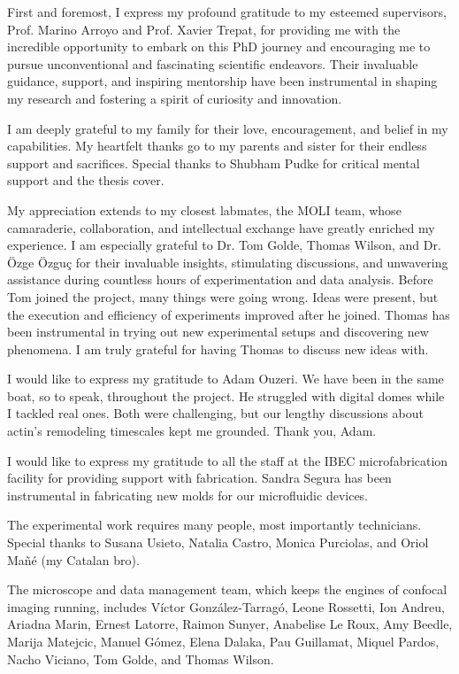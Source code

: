 \begin{Acknowledgements}
First and foremost, I express my profound gratitude to my esteemed supervisors, Prof. Marino Arroyo and Prof. Xavier Trepat, for providing me with the incredible opportunity to embark on this PhD journey and encouraging me to pursue unconventional and fascinating scientific endeavors. Their invaluable guidance, support, and inspiring mentorship have been instrumental in shaping my research and fostering a spirit of curiosity and innovation.

I am deeply grateful to my family for their love, encouragement, and belief in my capabilities. My heartfelt thanks go to my parents and sister for their endless support and sacrifices. Special thanks to Shubham Pudke for critical mental support and the thesis cover.
	
My appreciation extends to my closest labmates, the MOLI team, whose camaraderie, collaboration, and intellectual exchange have greatly enriched my experience. I am especially grateful to Dr. Tom Golde, Thomas Wilson, and Dr. Özge Özguç for their invaluable insights, stimulating discussions, and unwavering assistance during countless hours of experimentation and data analysis. Before Tom joined the project, many things were going wrong. Ideas were present, but the execution and efficiency of experiments improved after he joined. Thomas has been instrumental in trying out new experimental setups and discovering new phenomena. I am truly grateful for having Thomas to discuss new ideas with.

I would like to express my gratitude to Adam Ouzeri. We have been in the same boat, so to speak, throughout the project. He struggled with digital domes while I tackled real ones. Both were challenging, but our lengthy discussions about actin's remodeling timescales kept me grounded. Thank you, Adam.

I would like to express my gratitude to all the staff at the IBEC microfabrication facility for providing support with fabrication. Sandra Segura has been instrumental in fabricating new molds for our microfluidic devices.

The experimental work requires many people, most importantly technicians. Special thanks to Susana Usieto, Natalia Castro, Monica Purciolas, and Oriol Mañé (my Catalan bro).

The microscope and data management team, which keeps the engines of confocal imaging running, includes Víctor González-Tarragó, Leone Rossetti, Ion Andreu, Ariadna Marin, Ernest Latorre, Raimon Sunyer, Anabelise Le Roux, Amy Beedle, Marija Matejcic, Manuel Gómez, Elena Dalaka, Pau Guillamat, Miquel Pardos, Nacho Viciano, Tom Golde, and Thomas Wilson.


\end{Acknowledgements}
